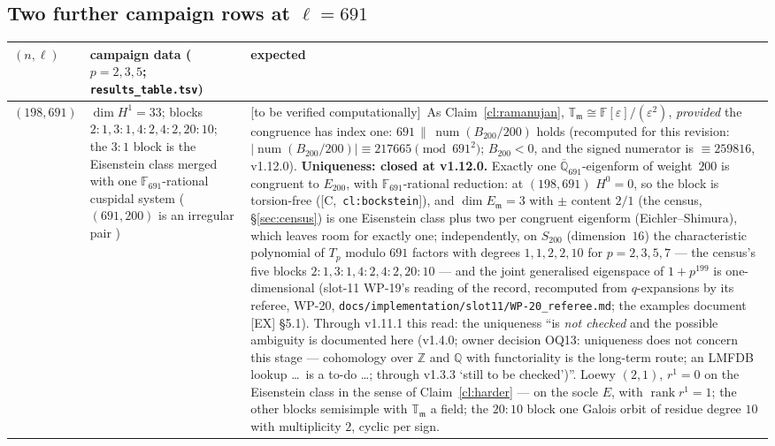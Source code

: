 \documentclass[11pt]{article}
\theoremstyle{remark}
\newcommand{\F}{\mathbb{F}}
\newcommand{\Z}{\mathbb{Z}}
\newcommand{\Q}{\mathbb{Q}}
\DeclareMathOperator{\rank}{rank}
\DeclareMathOperator{\num}{num}
\newcommand{\T}{\mathbb{T}}
\newcommand{\m}{\mathfrak{m}}
\newcommand{\HA}[1]{[C,~\texttt{#1}]}      %
\newcommand{\VERIFY}{\textsf{[to be verified computationally]}}
\begin{document}
\subsection{Two further campaign rows at \texorpdfstring{$\ell=691$}{l=691}}
\begin{center}\small
\begin{tabular}{@{}>{\raggedright\arraybackslash}p{1.6cm}>{\raggedright\arraybackslash}p{5.2cm}>{\raggedright\arraybackslash}p{8.6cm}@{}}
\toprule
$(n,\ell)$ & campaign data ($p=2,3,5$; \texttt{results\_table.tsv}) & expected \\
\midrule
$(198,691)$ & $\dim H^1=33$; blocks $2{:}1,3{:}1,4{:}2,4{:}2,20{:}10$; the $3{:}1$ block is the
Eisenstein class merged with one $\F_{691}$-rational cuspidal system ($(691,200)$ is an irregular
pair \cite{washington}) & \VERIFY\ As Claim~\ref{cl:ramanujan}, $\T_\m\cong\F[\varepsilon]/(\varepsilon^2)$,
\emph{provided} the congruence has index one: $691\,\|\,\num(B_{200}/200)$ holds (recomputed for
this revision: $|\num(B_{200}/200)|\equiv217665\pmod{691^2}$; $B_{200}<0$, and the signed numerator is
$\equiv259816$, v1.12.0). \textbf{Uniqueness: closed at v1.12.0.} Exactly one $\overline{\Q}_{691}$-eigenform
of weight~$200$ is congruent to $E_{200}$, with $\F_{691}$-rational reduction: at $(198,691)$ $H^0=0$, so
the block is torsion-free (\HA{cl:bockstein}), and $\dim E_\m=3$ with $\pm$ content $2/1$ (the census,
\S\ref{sec:census}) is one Eisenstein class plus two per congruent eigenform (Eichler--Shimura), which
leaves room for exactly one; independently, on $S_{200}$ (dimension~$16$) the characteristic polynomial of
$T_p$ modulo $691$ factors with degrees $1,1,2,2,10$ for $p=2,3,5,7$ --- the census's five blocks
$2{:}1,3{:}1,4{:}2,4{:}2,20{:}10$ --- and the joint generalised eigenspace of $1+p^{199}$ is
one-dimensional (slot-11 WP-19's reading of the record, recomputed from $q$-expansions by its referee,
WP-20, \texttt{docs/implementation/slot11/WP-20\_referee.md}; the examples document [EX] \S5.1). Through
v1.11.1 this read: the uniqueness ``is \emph{not checked} and the possible ambiguity is documented here
(v1.4.0; owner decision OQ13: uniqueness does not concern this stage --- cohomology over $\Z$ and $\Q$
with functoriality is the long-term route; an LMFDB lookup \ldots\ is a to-do \ldots; through v1.3.3
`still to be checked')''. Loewy $(2,1)$, $r^1=0$ on the
Eisenstein class in the sense of Claim~\ref{cl:harder} --- on the socle $E$, with
$\rank r^1=1$; the other blocks semisimple with $\T_\m$ a field; the $20{:}10$ block one
Galois orbit of residue degree $10$ with multiplicity $2$, cyclic per sign. \\

\end{tabular}
\end{center}
\end{document}
